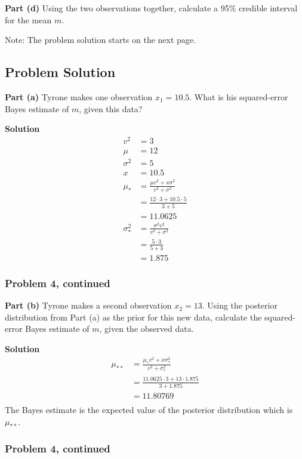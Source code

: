 \documentclass[12pt]{article}
\theoremstyle{definition}
\begin{document}
\bigskip
\noindent
{\bf Part (d)} Using the two observations together, calculate a 95\% credible interval for the mean $m$.

\bigskip
\noindent
Note: The problem solution starts on the next page.

\newpage
\subsection*{Problem Solution}

\noindent
{\bf Part (a)} Tyrone makes one observation $x_1 = 10.5$. What is his squared-error Bayes estimate of $m$, given this data?

\bigskip
\noindent
{\bf Solution} 
\begin{align*}
v^2 &= 3\\
\mu &= 12\\
\sigma^2 &= 5\\
x &= 10.5\\
\mu_* &= \frac{\mu v^2 + x\sigma^2}{v^2 + \sigma^2}\\
&= \frac{12 \cdot 3 + 10.5 \cdot 5}{3 + 5}\\
&= 11.0625\\
\sigma^2_* &= \frac{\sigma^2 v^2}{v^2 + \sigma^2}\\
&= \frac{5 \cdot 3}{5 + 3}\\
&= 1.875
\end{align*}


\newpage
\subsubsection*{Problem 4, continued}

\noindent
{\bf Part (b)} Tyrone makes a second observation $x_2 = 13$. Using the posterior distribution from Part (a) as the prior for this new data, calculate the squared-error Bayes estimate of $m$, given the observed data.

\bigskip
\noindent
{\bf Solution} 
\begin{align*}
\mu_{**} &= \frac{\mu_* v^2 + x\sigma^2_*}{v^2 + \sigma^2_*}\\
&= \frac{11.0625 \cdot 3 + 13 \cdot 1.875}{3 + 1.875}\\
&= 11.80769\\
\end{align*}
The Bayes estimate is the expected value of the posterior distribution which is $\mu_{**}$.


\newpage
\subsubsection*{Problem 4, continued}
\end{document}

